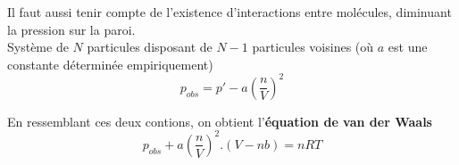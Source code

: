 \documentclass[british,french,11pt, a4paper, openany]{book}
\begin{document}
	Il faut aussi tenir compte de l'existence d'interactions entre molécules, diminuant la pression sur la paroi.\\
	Système de $N$ particules disposant de $N-1$ particules voisines (où $a$ est une constante déterminée empiriquement)
	$$p_{obs} = p' - a\left(\frac{n}{V}\right)^2$$
	
	En ressemblant ces deux contions, on obtient l'\textbf{équation de van der Waals}
	$$p_{obs} + a\left(\frac{n}{V}\right)^2 .\left(V -nb\right) = nRT$$
	
	
	
	
	\appendix
	
	
\end{document}
